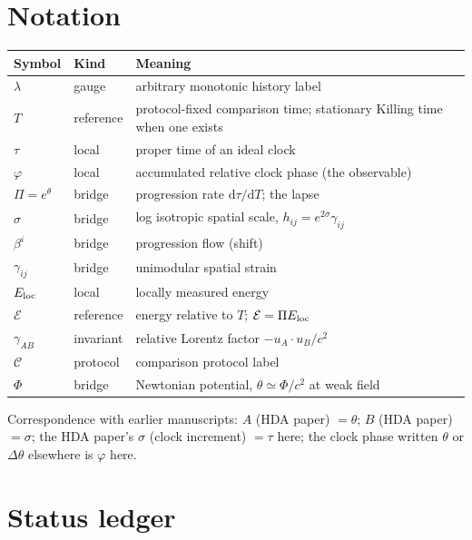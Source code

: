 \documentclass[11pt]{article}
\newcommand{\Pg}{\Pi}                 %
\newcommand{\thP}{\theta}             %
\newcommand{\sgP}{\sigma}             %
\newcommand{\cph}{\varphi}            %
\newcommand{\Eloc}{E_{\rm loc}}       %
\newcommand{\Eref}{\mathcal{E}}       %
\newcommand{\dd}{\mathrm{d}}
\newcommand{\Tref}{T}                 %
\theoremstyle{plain}
\theoremstyle{definition}
\theoremstyle{remark}
\begin{document}
\appendix

\section{Notation}
\label{app:notation}

\begin{longtable}{@{}>{\raggedright\arraybackslash}p{}>{\raggedright\arraybackslash}p{}>{\raggedright\arraybackslash}p{}@{}}
\toprule
Symbol & Kind & Meaning \\
\midrule
$\lambda$ & gauge & arbitrary monotonic history label \\
$\Tref$ & reference & protocol-fixed comparison time; stationary Killing time when one exists \\
$\tau$ & local & proper time of an ideal clock \\
$\cph$ & local & accumulated relative clock phase (the observable) \\
$\Pg=e^{\thP}$ & bridge & progression rate $\dd\tau/\dd\Tref$; the lapse \\
$\sgP$ & bridge & log isotropic spatial scale, $h_{ij}=e^{2\sgP}\gamma_{ij}$ \\
$\beta^i$ & bridge & progression flow (shift) \\
$\gamma_{ij}$ & bridge & unimodular spatial strain \\
$\Eloc$ & local & locally measured energy \\
$\Eref$ & reference & energy relative to $\Tref$; $\Eref=\Pg\Eloc$ \\
$\gamma_{AB}$ & invariant & relative Lorentz factor $-u_A\cdot u_B/c^2$ \\
$\mathcal C$ & protocol & comparison protocol label \\
$\Phi$ & bridge & Newtonian potential, $\thP\simeq\Phi/c^2$ at weak field \\
\bottomrule
\end{longtable}

Correspondence with earlier manuscripts: $A$ (HDA paper) $=\thP$; $B$ (HDA paper) $=\sgP$; the HDA paper's $\sigma$ (clock increment) $=\tau$ here; the clock phase written $\theta$ or $\Delta\theta$ elsewhere is $\cph$ here.

\section{Status ledger}
\label{app:ledger}
\end{document}
